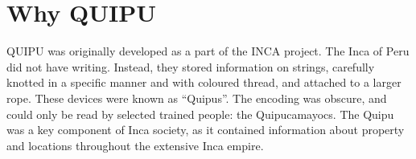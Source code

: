 \section {Why QUIPU}

QUIPU was originally developed as a part of the INCA project.
The Inca of Peru did not have writing.  Instead, they stored information on
strings, carefully knotted in a specific manner and with coloured thread, and
attached to a larger rope.
These devices were known as ``Quipus''.
The encoding was obscure, and could only be read by selected trained people:
the Quipucamayocs.
The Quipu was a key component of Inca society, as it contained information
about property and locations throughout the extensive Inca empire.



